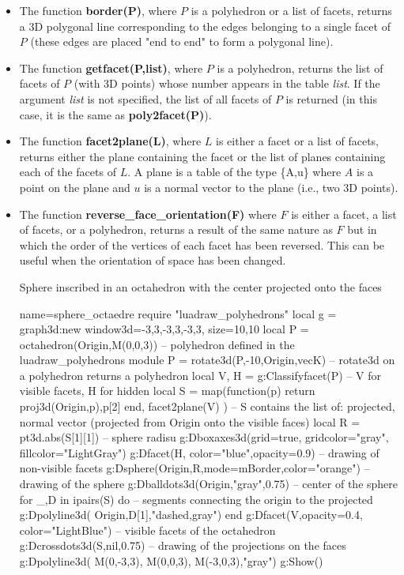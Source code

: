 \begin{itemize}
    \item The function \textbf{border(P)}, where $P$ is a polyhedron or a list of facets, returns a 3D polygonal line corresponding to the edges belonging to a single facet of $P$ (these edges are placed "end to end" to form a polygonal line).

    \item The function \textbf{getfacet(P,list)}, where $P$ is a polyhedron, returns the list of facets of $P$ (with 3D points) whose number appears in the table \emph{list}. If the argument \emph{list} is not specified, the list of all facets of $P$ is returned (in this case, it is the same as \textbf{poly2facet(P)}).

    \item The function \textbf{facet2plane(L)}, where $L$ is either a facet or a list of facets, returns either the plane containing the facet or the list of planes containing each of the facets of $L$. A plane is a table of the type \{A,u\} where $A$ is a point on the plane and $u$ is a normal vector to the plane (i.e., two 3D points).

    \item The function \textbf{reverse\_face\_orientation(F)} where $F$ is either a facet, a list of facets, or a polyhedron, returns a result of the same nature as $F$ but in which the order of the vertices of each facet has been reversed. This can be useful when the orientation of space has been changed.

\begin{demo}{Sphere inscribed in an octahedron with the center projected onto the faces}
\begin{luadraw}{name=sphere_octaedre}
require "luadraw_polyhedrons"
local g = graph3d:new{ window3d={-3,3,-3,3,-3,3}, size={10,10}}
local P = octahedron(Origin,M(0,0,3)) -- polyhedron defined in the luadraw_polyhedrons module
P = rotate3d(P,-10,{Origin,vecK}) -- rotate3d on a polyhedron returns a polyhedron
local V, H = g:Classifyfacet(P) -- V for visible facets, H for hidden
local S = map(function(p) return {proj3d(Origin,p),p[2]} end, facet2plane(V) )
-- S contains the list of: {projected, normal vector} (projected from Origin onto the visible faces)
local R = pt3d.abs(S[1][1]) -- sphere radisu
g:Dboxaxes3d({grid=true, gridcolor="gray", fillcolor="LightGray"})
g:Dfacet(H, {color="blue",opacity=0.9}) -- drawing of non-visible facets
g:Dsphere(Origin,R,{mode=mBorder,color="orange"}) -- drawing of the sphere
g:Dballdots3d(Origin,"gray",0.75) -- center of the sphere
for _,D in ipairs(S) do -- segments connecting the origin to the projected
    g:Dpolyline3d( {Origin,D[1]},"dashed,gray")
end
g:Dfacet(V,{opacity=0.4, color="LightBlue"}) -- visible facets of the octahedron
g:Dcrossdots3d(S,nil,0.75) -- drawing of the projections on the faces
g:Dpolyline3d( {M(0,-3,3), M(0,0,3), M(-3,0,3)},"gray")
g:Show()            
\end{luadraw}
\end{demo}
\end{itemize}

